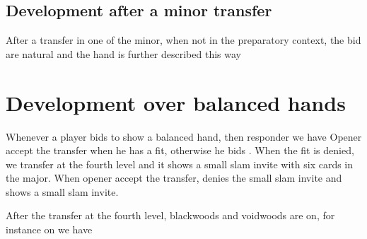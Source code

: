 \subsection{Development after a minor transfer}
After a transfer in one of the minor, when not in the preparatory context, the bid are natural and the hand is further described this way
\section{Development over \bid{2\NT} balanced hands}
Whenever a player bids \bid{2\NT} to show a balanced hand, then responder we have
Opener accept the transfer when he has a fit, otherwise he bids \bid{3\NT}. When the fit is denied, we transfer at the fourth level and it shows a small slam invite with six cards in the major. When opener accept the transfer, \bid{3\NT} denies the small slam invite and  shows a small slam invite.

After the transfer at the fourth level, blackwoods and voidwoods are on, for instance on
we have
